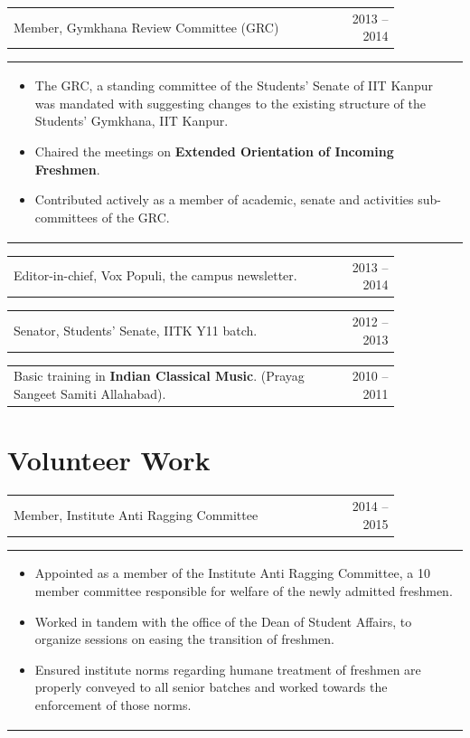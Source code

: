 \documentclass[a4paper,10pt]{article} %
\newcommand{\iproject}[3]{
    \begin{tabular}{p{0.85\linewidth}r}
        \textcolor{NavyBlue}{#2} & \multicolumn{1}{m{3cm}}{\raggedleft \textsc{#1}}\\
    \end{tabular}
    \begin{tabular}{p{\linewidth}}
    \vspace{-0.3cm}
        \footnotesize{#3}
    \end{tabular}
    \vspace{-0.5cm}
}
\newcommand{\skill}[2]{
    \begin{tabular}{p{0.85\linewidth}r}
        #2 & \multicolumn{1}{m{3cm}}{\raggedleft \textsc{#1}}\\
    \end{tabular}
    \vspace{-0.5cm}
}
\begin{document}
\iproject {2013 -- 2014}
          {Member, Gymkhana Review Committee (GRC)}
          {
               \begin{itemize}[leftmargin=0.5cm]
                   \item The GRC, a standing committee of the Students' Senate of IIT Kanpur was mandated with suggesting changes to the existing structure of the Students' Gymkhana, IIT Kanpur.
                   \item Chaired the meetings on \textbf{Extended Orientation of Incoming Freshmen}.
                   \item Contributed actively as a member of academic, senate and activities sub-committees of the GRC.
               \end{itemize}
          }

\skill {2013 -- 2014}
       {Editor-in-chief, Vox Populi, the campus newsletter.}

\skill {2012 -- 2013}
       {Senator, Students' Senate, IITK Y11 batch.}

\skill {2010 -- 2011}
       {Basic training in \textbf{Indian Classical Music}. (Prayag Sangeet Samiti Allahabad).}


\section{Volunteer Work}

\iproject {2014 -- 2015}
          {Member, Institute Anti Ragging Committee}
          {
               \begin{itemize}[leftmargin=0.5cm]
                   \item Appointed as a member of the Institute Anti Ragging Committee, a 10 member committee responsible
                       for welfare of the newly admitted freshmen.
                   \item Worked in tandem with the office of the Dean of Student Affairs, to organize sessions
                       on easing the transition of freshmen.
                   \item Ensured institute norms regarding humane treatment of freshmen are properly conveyed to all senior batches
                       and worked towards the enforcement of those norms.
               \end{itemize}
          }
\end{document}
